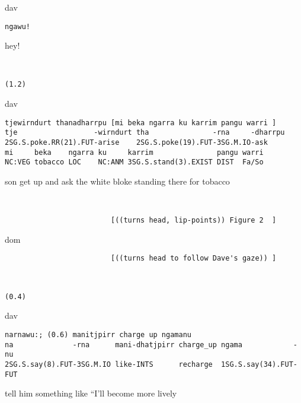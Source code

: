 \documentclass[output=paper,nonflat,colorlinks,citecolor=brown]{langsci/langscibook}
\begin{document}
\vspace{2mm}
%
\begin{transbox}{1}{dav}
\begin{verbatim}
ngawu!
\end{verbatim}
hey!
\end{transbox}
%
\begin{transbox}{2}{~}
\begin{verbatim}
(1.2)
\end{verbatim}
\end{transbox}
%
\begin{mdframednoverticalspace}[style=firstfoc]
\begin{transbox}{3}{dav}
\begin{verbatim}
tjewirndurt thanadharrpu [mi beka ngarra ku karrim pangu warri ]
tje                  -wirndurt tha               -rna     -dharrpu
2SG.S.poke.RR(21).FUT-arise    2SG.S.poke(19).FUT-3SG.M.IO-ask
mi     beka    ngarra ku     karrim               pangu warri
NC:VEG tobacco LOC    NC:ANM 3SG.S.stand(3).EXIST DIST  Fa/So
\end{verbatim}
son get up and ask the white bloke standing there for tobacco
\end{transbox}
\end{mdframednoverticalspace}
%
\begin{mdframednoverticalspace}[style=firstfoc]
\begin{transbox}{4}{~}
\begin{verbatim}
                         [((turns head, lip-points)) Figure 2  ]
\end{verbatim}
\end{transbox}
\end{mdframednoverticalspace}
\begin{transbox}{5}{dom}
\begin{verbatim}
                         [((turns head to follow Dave's gaze)) ]
\end{verbatim}
\end{transbox}
%
\begin{transbox}{6}{~}
\begin{verbatim}
(0.4)
\end{verbatim}
\end{transbox}
%
\begin{mdframednoverticalspace}[style=firstfoc]
\begin{transbox}{7}{dav}
\begin{verbatim}
narnawu:; (0.6) manitjpirr charge up ngamanu
na              -rna      mani-dhatjpirr charge_up ngama            -nu
2SG.S.say(8).FUT-3SG.M.IO like-INTS      recharge  1SG.S.say(34).FUT-FUT
\end{verbatim}
tell him something like “I'll become more lively
\end{transbox}
\end{mdframednoverticalspace}
\end{document}
